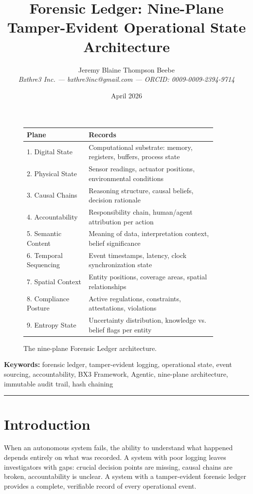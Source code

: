\documentclass[12pt]{article}
\title{Forensic Ledger: Nine-Plane Tamper-Evident Operational State Architecture}
\author{Jeremy Blaine Thompson Beebe\\ \textit{Bxthre3 Inc. --- bxthre3inc@gmail.com --- ORCID: 0009-0009-2394-9714}}
\date{April 2026}
\begin{document}
\maketitle

\begin{figure}[htbp]
\centering
\caption{The nine-plane Forensic Ledger architecture.}
\label{fig:nine-plane-arch}
\begin{tabular}{p{0.30\linewidth}p{0.62\linewidth}}
\toprule
\textbf{Plane} & \textbf{Records} \\
\midrule
1. Digital State & Computational substrate: memory, registers, buffers, process state \\
2. Physical State & Sensor readings, actuator positions, environmental conditions \\
3. Causal Chains & Reasoning structure, causal beliefs, decision rationale \\
4. Accountability & Responsibility chain, human/agent attribution per action \\
5. Semantic Content & Meaning of data, interpretation context, belief significance \\
6. Temporal Sequencing & Event timestamps, latency, clock synchronization state \\
7. Spatial Context & Entity positions, coverage areas, spatial relationships \\
8. Compliance Posture & Active regulations, constraints, attestations, violations \\
9. Entropy State & Uncertainty distribution, knowledge vs. belief flags per entity \\
\bottomrule
\end{tabular}
\end{figure}

\vspace{0.5em}
\noindent\textbf{Keywords:} forensic ledger, tamper-evident logging, operational state, event sourcing, accountability, BX3 Framework, Agentic, nine-plane architecture, immutable audit trail, hash chaining

\vspace{1em}
\hrule
\vspace{1em}

\section{Introduction}
\label{sec:intro}

When an autonomous system fails, the ability to understand what happened depends entirely on what was recorded. A system with poor logging leaves investigators with gaps: crucial decision points are missing, causal chains are broken, accountability is unclear. A system with a tamper-evident forensic ledger provides a complete, verifiable record of every operational event.
\end{document}
